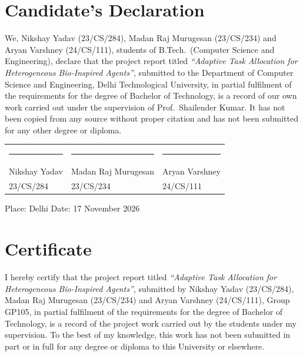 \documentclass[12pt,a4paper]{article}
\begin{document}
\setcounter{page}{2}

\section*{Candidate's Declaration}
We, Nikshay Yadav (23/CS/284), Madan Raj Murugesan (23/CS/234) and Aryan Varshney (24/CS/111),
students of B.Tech.\ (Computer Science and Engineering), declare that the project report titled \emph{``Adaptive Task Allocation for
Heterogeneous Bio-Inspired Agents''}, submitted to the Department of Computer Science and Engineering,
Delhi Technological University, in partial fulfilment of the requirements for the degree of Bachelor of
Technology, is a record of our own work carried out under the supervision of Prof.~Shailender Kumar. It
has not been copied from any source without proper citation and has not been submitted for any other
degree or diploma.

\vspace{1.6cm}
\noindent
\begin{tabular}{@{}p{}p{}p{}@{}}
\rule{4.2cm}{0.4pt} & \rule{4.2cm}{0.4pt} & \rule{4.2cm}{0.4pt} \\
Nikshay Yadav & Madan Raj Murugesan & Aryan Varshney \\
23/CS/284 & 23/CS/234 & 24/CS/111 \\
\end{tabular}

\vspace{0.4cm}
\noindent Place: Delhi \hfill Date: 17 November 2026

\vspace{1.2cm}
\section*{Certificate}
I hereby certify that the project report titled \emph{``Adaptive Task Allocation for Heterogeneous
Bio-Inspired Agents''}, submitted by Nikshay Yadav (23/CS/284), Madan Raj Murugesan (23/CS/234) and
Aryan Varshney (24/CS/111), Group GP105, in partial fulfilment of the requirements for the degree of Bachelor of Technology, is a
record of the project work carried out by the students under my supervision. To the best of my
knowledge, this work has not been submitted in part or in full for any degree or diploma to this
University or elsewhere.
\end{document}
